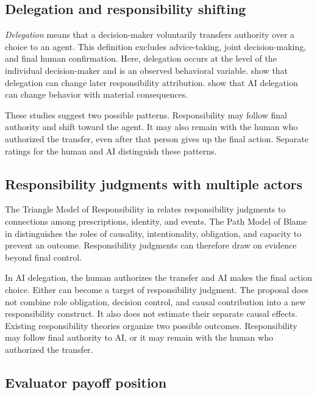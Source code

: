 \documentclass[11pt,a4paper]{article}
\newcommand{\term}[1]{\textit{#1}}
\begin{document}
\subsection{Delegation and responsibility shifting}

\term{Delegation} means that a decision-maker voluntarily transfers authority over a choice to an agent. This definition excludes advice-taking, joint decision-making, and final human confirmation. Here, delegation occurs at the level of the individual decision-maker and is an observed behavioral variable. \citet{BartlingFischbacher2012} show that delegation can change later responsibility attribution. \citet{KobisEtAl2025} show that AI delegation can change behavior with material consequences.

These studies suggest two possible patterns. Responsibility may follow final authority and shift toward the agent. It may also remain with the human who authorized the transfer, even after that person gives up the final action. Separate ratings for the human and AI distinguish these patterns.

\subsection{Responsibility judgments with multiple actors}

The Triangle Model of Responsibility in \citet{SchlenkerEtAl1994} relates responsibility judgments to connections among prescriptions, identity, and events. The Path Model of Blame in \citet{MalleEtAl2014} distinguishes the roles of causality, intentionality, obligation, and capacity to prevent an outcome. Responsibility judgments can therefore draw on evidence beyond final control.

In AI delegation, the human authorizes the transfer and AI makes the final action choice. Either can become a target of responsibility judgment. The proposal does not combine role obligation, decision control, and causal contribution into a new responsibility construct. It also does not estimate their separate causal effects. Existing responsibility theories organize two possible outcomes. Responsibility may follow final authority to AI, or it may remain with the human who authorized the transfer.

\subsection{Evaluator payoff position}
\end{document}
